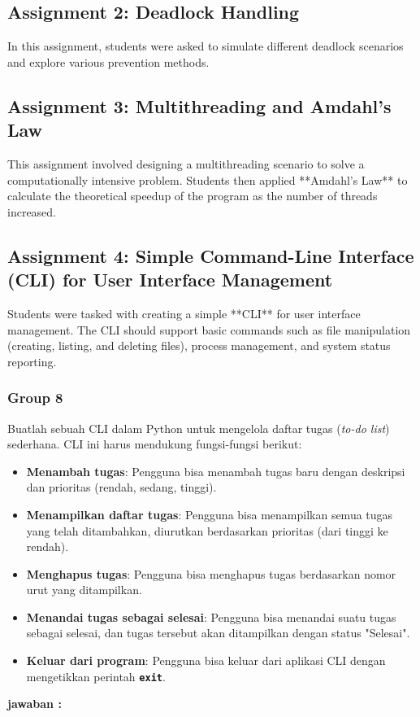 \documentclass[12pt]{article}
\begin{document}
	\subsection{Assignment 2: Deadlock Handling}
	In this assignment, students were asked to simulate different deadlock scenarios and explore various prevention methods.
	
	\subsection{Assignment 3: Multithreading and Amdahl's Law}
	This assignment involved designing a multithreading scenario to solve a computationally intensive problem. Students then applied **Amdahl's Law** to calculate the theoretical speedup of the program as the number of threads increased.
	
	\subsection{Assignment 4: Simple Command-Line Interface (CLI) for User Interface Management}
	Students were tasked with creating a simple **CLI** for user interface management. The CLI should support basic commands such as file manipulation (creating, listing, and deleting files), process management, and system status reporting.
	\subsubsection{Group 8}
	Buatlah sebuah CLI dalam Python untuk mengelola daftar tugas (\textit{to-do list}) sederhana. CLI ini harus mendukung fungsi-fungsi berikut:
	\begin{itemize}
		\item \textbf{Menambah tugas}: Pengguna bisa menambah tugas baru dengan deskripsi dan prioritas (rendah, sedang, tinggi).
		\item \textbf{Menampilkan daftar tugas}: Pengguna bisa menampilkan semua tugas yang telah ditambahkan, diurutkan berdasarkan prioritas (dari tinggi ke rendah).
		\item \textbf{Menghapus tugas}: Pengguna bisa menghapus tugas berdasarkan nomor urut yang ditampilkan.
		\item \textbf{Menandai tugas sebagai selesai}: Pengguna bisa menandai suatu tugas sebagai selesai, dan tugas tersebut akan ditampilkan dengan status "Selesai".
		\item \textbf{Keluar dari program}: Pengguna bisa keluar dari aplikasi CLI dengan mengetikkan perintah \texttt{\textbf{exit}}.
	\end{itemize}
	\textbf{jawaban :}
	
\end{document}
